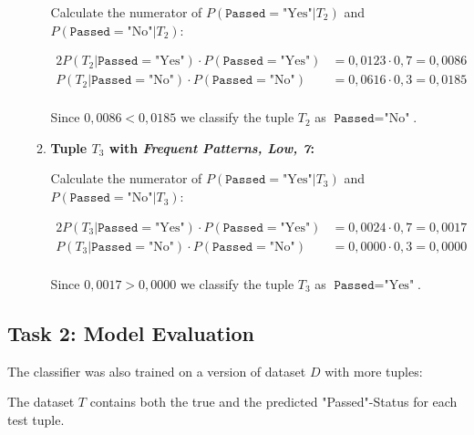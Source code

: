 \documentclass[
english,
smallborders
]{i6prcsht}
\newcommand{\BayesNumerator}[3]{P(#1 | \texttt{#2}=\text{"#3"}) \cdot P(\texttt{#2}=\text{"#3"})}
\newcommand{\PosterioriProbability}[3]{P(\texttt{#2}=\text{"#3"} | #1)}
\newcommand{\ResultClass}[2]{\texttt{#1}=\text{"#2"}}
\begin{document}
\begin{solution}
\begin{enumerate}
\begin{enumerate}
			            Calculate the numerator of $\PosterioriProbability{T_2}{Passed}{Yes}$ and $\PosterioriProbability{T_2}{Passed}{No}$:

			            \begin{alignat*}{2}
				            \BayesNumerator{T_2}{Passed}{Yes} & = 0,0123 \cdot 0,7 = 0,0086 \\
				            \BayesNumerator{T_2}{Passed}{No}  & = 0,0616 \cdot 0,3 = 0,0185 \\
			            \end{alignat*}

			            Since $0,0086 < 0,0185$ we classify the tuple $T_2$ as $\ResultClass{Passed}{No}$.

			      \item \textbf{Tuple $T_3$ with \textit{Frequent Patterns, Low, 7}:}

			            Calculate the numerator of $\PosterioriProbability{T_3}{Passed}{Yes}$ and $\PosterioriProbability{T_3}{Passed}{No}$:

			            \begin{alignat*}{2}
				            \BayesNumerator{T_3}{Passed}{Yes} & = 0,0024 \cdot 0,7 = 0,0017 \\
				            \BayesNumerator{T_3}{Passed}{No}  & = 0,0000 \cdot 0,3 = 0,0000 \\
			            \end{alignat*}

			            Since $0,0017 > 0,0000$ we classify the tuple $T_3$ as $\ResultClass{Passed}{Yes}$.
		      \end{enumerate}



	\end{enumerate}
\end{solution}

\subsection*{Task 2: Model Evaluation}

The classifier was also trained on a version of dataset $D$ with more tuples:

The dataset $T$ contains both the true and the predicted "Passed"-Status for each test tuple.
\end{document}
